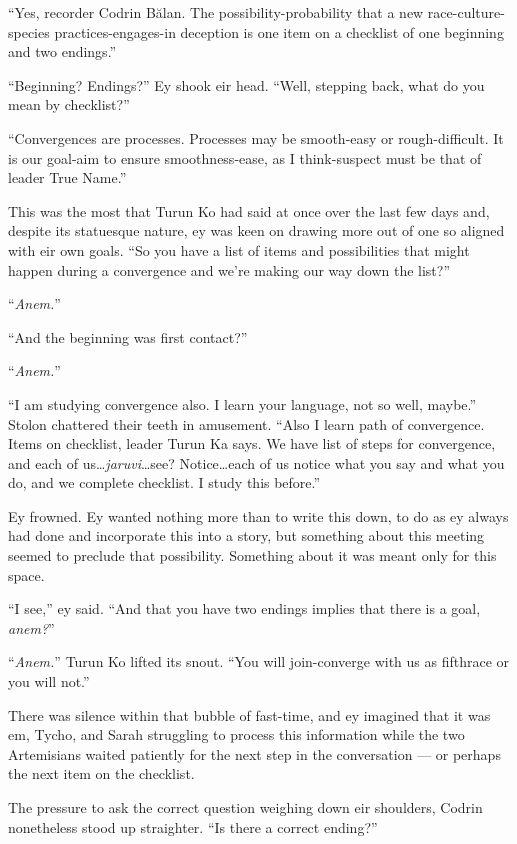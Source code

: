 ``Yes, recorder Codrin Bălan. The possibility-probability that a new race-culture-species practices-engages-in deception is one item on a checklist of one beginning and two endings.''

``Beginning? Endings?'' Ey shook eir head. ``Well, stepping back, what do you mean by checklist?''

``Convergences are processes. Processes may be smooth-easy or rough-difficult. It is our goal-aim to ensure smoothness-ease, as I think-suspect must be that of leader True Name.''

This was the most that Turun Ko had said at once over the last few days and, despite its statuesque nature, ey was keen on drawing more out of one so aligned with eir own goals. ``So you have a list of items and possibilities that might happen during a convergence and we're making our way down the list?''

``\emph{Anem.}''

``And the beginning was first contact?''

``\emph{Anem.}''

``I am studying convergence also. I learn your language, not so well, maybe.'' Stolon chattered their teeth in amusement. ``Also I learn path of convergence. Items on checklist, leader Turun Ka says. We have list of steps for convergence, and each of us\ldots{}\emph{jaruvi}\ldots see? Notice\ldots each of us notice what you say and what you do, and we complete checklist. I study this before.''

Ey frowned. Ey wanted nothing more than to write this down, to do as ey always had done and incorporate this into a story, but something about this meeting seemed to preclude that possibility. Something about it was meant only for this space.

``I see,'' ey said. ``And that you have two endings implies that there is a goal, \emph{anem?}''

``\emph{Anem.}'' Turun Ko lifted its snout. ``You will join-converge with us as fifthrace or you will not.''

There was silence within that bubble of fast-time, and ey imagined that it was em, Tycho, and Sarah struggling to process this information while the two Artemisians waited patiently for the next step in the conversation — or perhaps the next item on the checklist.

The pressure to ask the correct question weighing down eir shoulders, Codrin nonetheless stood up straighter. ``Is there a correct ending?''

